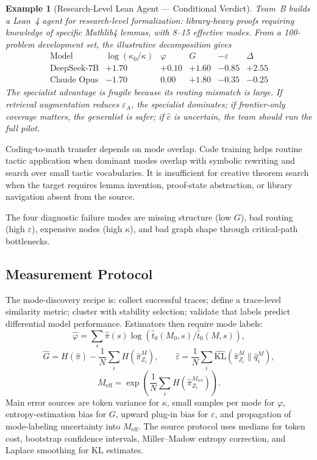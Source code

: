 \documentclass[10pt]{article}
\theoremstyle{paperplain}
\theoremstyle{paperdefinition}
\theoremstyle{paperremark}
\newtheorem{example}[theorem]{Example}
\newcommand{\KL}{\mathrm{KL}}
\newcommand{\Meff}{M_{\mathrm{eff}}}
\begin{document}
\begin{example}[Research-Level Lean Agent --- Conditional Verdict]
\label{ex:research-level}
Team~B builds a Lean~4 agent for research-level formalization:
library-heavy proofs requiring knowledge of specific Mathlib4 lemmas,
with 8--15 effective modes.
From a 100-problem development set, the illustrative decomposition gives
\[
\begin{array}{lrrrrr}
\text{Model} & \log(\kappa_0/\kappa) & \varphi & G & -\varepsilon & \Delta\\
\hline
\text{DeepSeek-7B} & +1.70 & +0.10 & +1.60 & -0.85 & +2.55\\
\text{Claude Opus} & -1.70 & 0.00 & +1.80 & -0.35 & -0.25
\end{array}
\]
The specialist advantage is fragile because its routing mismatch is large. If retrieval augmentation reduces $\varepsilon_A$, the specialist dominates; if frontier-only coverage matters, the generalist is safer; if $\hat c$ is uncertain, the team should run the full pilot.
\end{example}

Coding-to-math transfer depends on mode overlap. Code training helps routine tactic application when dominant modes overlap with symbolic rewriting and search over small tactic vocabularies. It is insufficient for creative theorem search when the target requires lemma invention, proof-state abstraction, or library navigation absent from the source.

The four diagnostic failure modes are missing structure (low $G$), bad routing (high $\varepsilon$), expensive nodes (high $\kappa$), and bad graph shape through critical-path bottlenecks.

\subsection{Measurement Protocol}
\label{subsec:mode-discovery}
\label{subsec:estimators}
\label{subsec:pilot}

The mode-discovery recipe is: collect successful traces; define a trace-level similarity metric; cluster with stability selection; validate that labels predict differential model performance. Estimators then require mode labels:
\[
\hat\varphi=\sum_s\hat\pi(s)\log(\hat t_0(M_0,s)/\hat t_0(M,s)),
\]
\[
\hat G=H(\hat\pi)-\frac{1}{N}\sum_i H(\hat\pi_{Z_i}^M),
\qquad
\hat\varepsilon=\frac{1}{N}\sum_i\widehat{\KL}(\hat\pi_{Z_i}^M\|\hat q_i^M),
\]
\[
\overline M_{\mathrm{eff}}=\exp\!\left(\frac{1}{N}\sum_i H(\hat\pi_{Z_i}^{M_{\mathrm{ref}}})\right).
\]
Main error sources are token variance for $\kappa$, small samples per mode for $\varphi$, entropy-estimation bias for $G$, upward plug-in bias for $\varepsilon$, and propagation of mode-labeling uncertainty into $\Meff$. The source protocol uses medians for token cost, bootstrap confidence intervals, Miller--Madow entropy correction, and Laplace smoothing for KL estimates.
\end{document}
